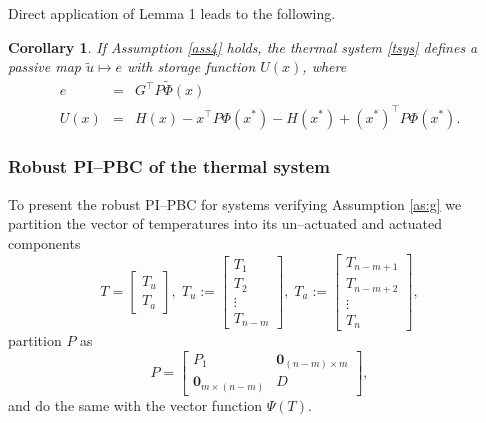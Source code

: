 \documentclass[10pt, conference]{ieeeconf}
\newtheorem{corollary}{Corollary}
\def\begequarrs{\begin{eqnarray*}}
\def\endequarrs{\end{eqnarray*}}
\def\lef[{\left[\begin{array}}
	\def\rig]{\end{array}\right]}
\begin{document}
Direct application of Lemma 1 leads to the following. 
\begin{corollary}
If Assumption \ref{ass4} holds, the thermal system \eqref{tsys} defines a passive map $\tilde u \mapsto e$
with storage function $U(x)$, where 
\begequarrs
e & = & G^\top P \tilde \Phi(x) \\
U(x) & = & H(x) - x^\top P \Phi(x^*) - H(x^*) + (x^*)^\top P \Phi(x^*).
\endequarrs
\end{corollary}
\subsubsection{Robust PI--PBC of the thermal system}
To present the robust PI--PBC for systems verifying Assumption \ref{as:g} we partition the vector of temperatures into its un--actuated and actuated components
$$
T=\lef[{c} T_u \\ T_a\rig],\;T_u:=\lef[{c} T_1 \\ T_2 \\ \vdots \\ T_{n-m}\rig],\;T_a:=\lef[{c} T_{n-m+1}\\T_{n-m+2}\\ \vdots \\ T_n\rig],
$$
partition $P$ as
\begin{equation*}
	P = \begin{bmatrix} P_1 & \mathbf{0}_{(n-m) \times m} \\ \mathbf{0}_{m\times (n-m)} & D \end{bmatrix},
\end{equation*}
and do the same with the vector function $\Psi(T)$. 
\end{document}
